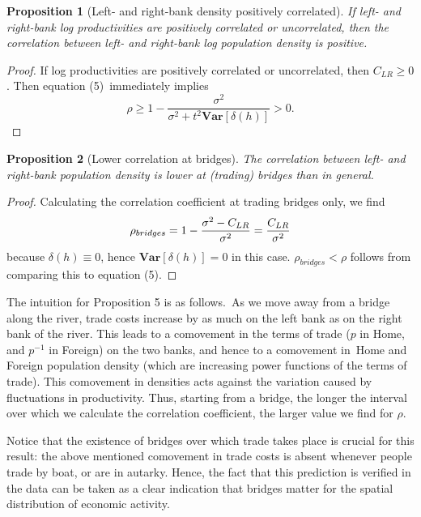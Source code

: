 \documentclass[12pt]{article}
\newtheorem{proposition}{Proposition}
\newcommand{\Var}{\mathbf{Var}}
\begin{document}
\begin{proposition}[Left- and right-bank density positively correlated]
If left- and right-bank log productivities are positively correlated or
uncorrelated, then the correlation between left- and right-bank log
population density is positive.
\end{proposition}

\begin{proof}
If log productivities are positively correlated or uncorrelated, then $%
C_{LR}\geq 0$. Then equation (5)\ immediately implies%
\[
\rho \geq 1-\frac{\sigma ^{2}}{\sigma ^{2}+t^{2}\Var\left[ \delta \left(
h\right) \right] }>0\text{.}
\]
\end{proof}

\begin{proposition}[Lower correlation at bridges]
The correlation between left- and right-bank population density is lower at
(trading) bridges than in general.
\end{proposition}

\begin{proof}
Calculating the correlation coefficient at trading bridges only, we find%
\[
\rho _{bridges}=1-\frac{\sigma ^{2}-C_{LR}}{\sigma ^{2}}=\frac{C_{LR}}{%
\sigma ^{2}}
\]%
because $\delta \left( h\right) \equiv 0$, hence $\Var\left[ \delta \left(
h\right) \right] =0$ in this case. $\rho _{bridges}<\rho $ follows from
comparing this to equation (5).
\end{proof}

The intuition for Proposition 5 is as follows.\ As we move away from a
bridge along the river, trade costs increase by as much on the left bank as
on the right bank of the river. This leads to a comovement in the terms of
trade ($p$ in Home, and $p^{-1}$ in Foreign) on the two banks, and
hence to a comovement in\ Home and Foreign population density (which are
increasing power functions of the terms of trade). This comovement in
densities acts against the variation caused by fluctuations in productivity.
Thus, starting from a bridge, the longer the interval over which we
calculate the correlation coefficient, the larger value we find for $\rho $.

Notice that the existence of bridges over which trade takes place is crucial
for this result: the above mentioned comovement in trade costs is absent
whenever people trade by boat, or are in autarky. Hence, the fact that this
prediction is verified in the data can be taken as a clear indication that
bridges matter for the spatial distribution of economic activity.
\end{document}
